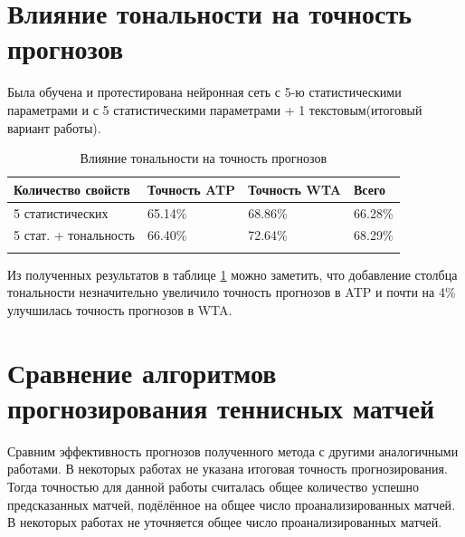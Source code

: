 \section{Влияние тональности на точность прогнозов}
Была обучена и протестирована нейронная сеть с 5-ю статистическими параметрами и с 5 статистическими параметрами + 1 текстовым(итоговый вариант работы).
\begin{longtable}{|l|l|l|l|}

			
			\hline
			
			Количество свойств& Точность ATP & Точность WTA & Всего  \\
			
			\hline 
			
			5 статистических & 65.14\% & 68.86\%&  66.28\% \\ \hline
			5 стат. + тональность   & 66.40\%&72.64\% & 68.29\%   \\
			
			
			\hline
				\caption{Влияние тональности на точность прогнозов}
	\label{tab:tabletone}

	
\end{longtable}
Из полученных результатов в таблице \ref{tab:tabletone} можно заметить, что добавление столбца тональности незначительно увеличило точность прогнозов в ATP и почти на 4\% улучшилась точность прогнозов в WTA.
\bigskip
\bigskip
\pagebreak


\section{Сравнение алгоритмов прогнозирования теннисных матчей}


Сравним эффективность прогнозов полученного метода с другими аналогичными работами.
В некоторых работах не указана итоговая точность прогнозирования. Тогда точностью для данной работы считалась общее количество успешно предсказанных матчей, подёлённое на общее число проанализированных матчей\cite{Book40}. В некоторых работах не уточняется общее число проанализированных матчей.
	
